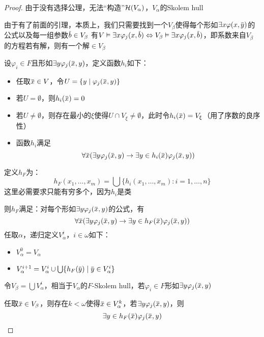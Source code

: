 \documentclass[11pt]{article}
\begin{document}
\begin{proof}
由于没有选择公理，无法“构造”\(\mathcal{H}(V_\alpha)\)，\(V_\alpha\)的Skolem hull

由于有了前面的引理，本质上，我们只需要找到一个\(V_\beta\)使得每个形如\(\exists x\varphi(x,\bary)\)的公式以及每一组参数\(\barb\in V_\beta\)
有\(V\vDash\exists x\varphi_j(x,\barb)\Leftrightarrow V_\beta\vDash\exists x\varphi_j(x,\barb)\)，即系数来自\(V_\beta\)的方程若有解，则有一个解\(\in V_\beta\)

设\(\varphi_i\in F\)且形如\(\exists y\varphi_j(\barx,y)\)，定义函数\(h_i\)如下：
\begin{itemize}
\item 任取\(\barx\in V\)，令\(U=\{y\mid\varphi_j(\barx,y)\}\)
\item 若\(U=\emptyset\)，则\(h_i(\barx)=0\)
\item 若\(U\neq\emptyset\)，则存在最小的\(\xi\)使得\(U\cap V_\xi\neq\emptyset\)，此时令\(h_i(\barx)=V_\xi\)（用了序数的良序性）
\item 函数\(h_i\)满足
\begin{equation*}
\forall\barx(\exists y\varphi_j(\barx,y)\to\exists y\in h_i(\barx)\varphi_j(\barx,y))
\end{equation*}
\end{itemize}

定义\(h_F\)为：
\begin{equation*}
h_F(x_1,\dots,x_m)=\bigcup\{h_i(x_1,\dots,x_m):i=1,\dots,n\}
\end{equation*}
这里必需要求只能有穷多个，因为\(h_i\)是类

则\(h_F\)满足：对每个形如\(\exists y\varphi_j(\barx,y)\)的公式，有
\begin{equation*}
\forall\barx(\exists y\varphi_j(\barx,y)\to\exists y\in h_F(\barx)\varphi_j(\barx,y))
\end{equation*}
任取\(\alpha\)，递归定义\(V_\alpha^i\)，\(i\in\omega\)如下：
\begin{itemize}
\item \(V_\alpha^0=V_\alpha\)
\item \(V_\alpha^{i+1}=V_\alpha^i\cup\bigcup\{h_F(\bary)\mid\bary\in V_\alpha^i\}\)
\end{itemize}


令\(V_\beta=\bigcup V_\alpha^i\)，相当于\(V_\alpha\)的\(F\)-Skolem hull，若\(\varphi_i\in F\)形如\(\exists y\varphi_j(\barx,y)\)

任取\(\barx\in V_\beta\)，则存在\(k<\omega\)使得\(\barx\in V_\alpha^k\)，若\(\exists y\varphi_j(\barx,y)\)，则
\begin{equation*}
\exists y\in h_F(\barx)\varphi_j(\barx,y)
\end{equation*}
\end{proof}
\end{document}
